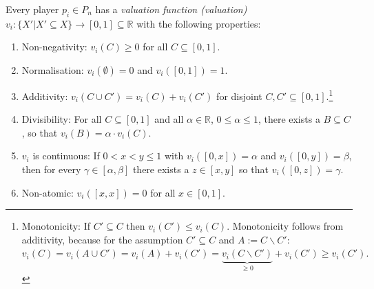 Every player $p_i\in P_n$ has a \emph{valuation function (valuation)} $v_i:\{X'|X' \subseteq X\} \rightarrow [0,1]\subseteq \mathbb{R}$ with the following properties:
\begin{enumerate}
\item Non-negativity: $v_i(C)\geq 0$ for all $C\subseteq [0,1].$
\item Normalisation: $v_i(\emptyset)=0$ and $v_i([0,1])=1.$
\item Additivity: $v_i(C \cup C')=v_i(C)+v_i(C')$ for disjoint
$C,C'\subseteq [0,1].$\footnote{Monotonicity: If $C' \subseteq C$ then $v_i(C') \leq v_i(C)$. Monotonicity follows from additivity, because for the assumption $C' \subseteq C$ and $A:=C\backslash C'$: $v_i(C)=v_i(A\cup C')=v_i(A)+v_i(C')=\underbrace{v_i(C\backslash C')}_{\geq 0}+v_i(C')\geq v_i(C').$}
\item Divisibility: For all $C\subseteq [0,1]$ and all $\alpha \in
\mathbb{R}$, $0\leq \alpha \leq 1$, there exists a $B\subseteq C$, so that
$v_i(B)=\alpha \cdot v_i(C).$
\item  $v_i$ is continuous: If $0<x<y\leq 1$ with $v_i([0,x])=\alpha$ and
$v_i([0,y])=\beta$, then for every $\gamma \in [\alpha,\beta]$ there exists a $z \in [x,y]$ so that $v_i([0,z])=\gamma.$
\item Non-atomic:  $v_i([x,x])=0$ for all $x\in [0,1].$
\end{enumerate}
